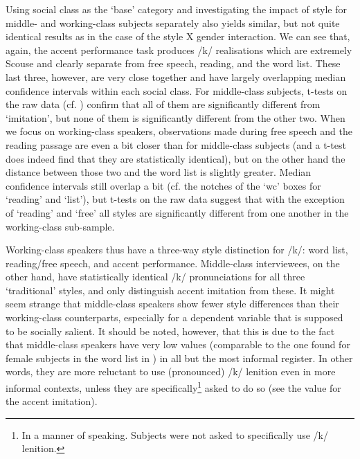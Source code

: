Using social class as the `base' category and investigating the impact of style for middle- and working-class subjects separately also yields similar, but not quite identical results as in the case of the style X gender interaction.
We can see that, again, the accent performance task produces /k/ realisations which are extremely Scouse and clearly separate from free speech, reading, and the word list.
These last three, however, are very close together and have largely overlapping median confidence intervals within each social class.
For middle-class subjects, t-tests on the raw data (cf. ) confirm that all of them are significantly different from `imitation', but none of them is significantly different from the other two.
When we focus on working-class speakers, observations made during free speech and the reading passage are even a bit closer than for middle-class subjects (and a t-test does indeed find that they are statistically identical), but on the other hand the distance between those two and the word list is slightly greater.
Median confidence intervals still overlap a bit (cf. the notches of the `wc' boxes for `reading' and `list'), but t-tests on the raw data suggest that with the exception of `reading' and `free' all styles are significantly different from one another in the working-class sub-sample.

Working-class speakers thus have a three-way style distinction for /k/: word list, reading/free speech, and accent performance.
Middle-class interviewees, on the other hand, have statistically identical /k/ pronunciations for all three `traditional' styles, and only distinguish accent imitation from these.
It might seem strange that middle-class speakers show fewer style differences than their work\-ing-class counterparts, especially for a dependent variable that is supposed to be socially salient.
It should be noted, however, that this is due to the fact that middle-class speakers have very low  values (comparable to the one found for female subjects in the word list in ) in all but the most informal register.
In other words, they are more reluctant to use (pronounced) /k/ lenition even in more informal contexts, unless they are specifically\footnote{In a manner of speaking. Subjects were not asked to specifically use /k/ lenition.} asked to do so (see the value for the accent imitation).

